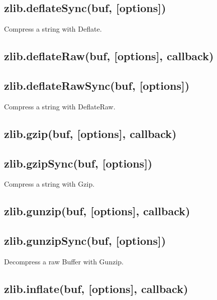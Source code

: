 \subsection{zlib.deflateSync(buf,
{[}options{]})}\label{zlib.deflatesyncbuf-options}

Compress a string with Deflate.

\subsection{zlib.deflateRaw(buf, {[}options{]},
callback)}\label{zlib.deflaterawbuf-options-callback}

\subsection{zlib.deflateRawSync(buf,
{[}options{]})}\label{zlib.deflaterawsyncbuf-options}

Compress a string with DeflateRaw.

\subsection{zlib.gzip(buf, {[}options{]},
callback)}\label{zlib.gzipbuf-options-callback}

\subsection{zlib.gzipSync(buf,
{[}options{]})}\label{zlib.gzipsyncbuf-options}

Compress a string with Gzip.

\subsection{zlib.gunzip(buf, {[}options{]},
callback)}\label{zlib.gunzipbuf-options-callback}

\subsection{zlib.gunzipSync(buf,
{[}options{]})}\label{zlib.gunzipsyncbuf-options}

Decompress a raw Buffer with Gunzip.

\subsection{zlib.inflate(buf, {[}options{]},
callback)}\label{zlib.inflatebuf-options-callback}


